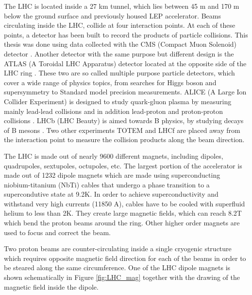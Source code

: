 The LHC is located inside a 27 km tunnel, which lies between 45 m and 170 m below the ground surface and previously housed LEP accelerator. Beams circulating inside the LHC, collide at four interaction points. At each of these points, a detector has been built to record the products of particle collisions. This thesis was done using data collected with the CMS (Compact Muon Solenoid) detector \cite{Chatrchyan:2008aa}. Another detector with the same purpose but different design is the ATLAS (A Toroidal LHC Apparatus) detector located at the opposite side of the LHC ring \cite{Aad:2008zzm}. These two are so called multiple purpose particle detectors, which cover a wide range of physics topics, from searches for Higgs boson and supersymmetry to Standard model precision measurements. ALICE (A Large Ion Collider Experiment) is designed to study quark-gluon plasma by measuring mainly lead-lead collisions and in addition lead-proton and proton-proton collisions \cite{Aamodt:2008zz}. LHCb (LHC Beauty) is aimed towards B physics, by studying decays of B mesons \cite{Alves:2008zz}. Two other experiments TOTEM and LHCf are placed away from the interaction point to measure the collision products along the beam direction.
\par The LHC is made out of nearly 9600 different magnets, including dipoles, quadrupoles, sextupoles, octupoles, etc. The largest portion of the accelerator is made out of 1232 dipole magnets which are made using superconducting niobium-titanium (NbTi) cables that undergo a phase transition to a supercondutive state at 9.2K. 
In order to achieve superconductivity and withstand very high currents (11850 A), cables have to be cooled with superfluid helium to less than 2K. They create large magnetic fields, which can reach 8.2T which bend the proton beams around the ring. Other higher order magnets are used to focus and correct the beam. 
\par Two proton beams are counter-circulating inside a single cryogenic structure which requires opposite magnetic field direction for each of the beams in order to be steared along the same circumference. One of the LHC dipole magnets is shown schematically in Figure \ref{fig:LHC_mag} together with the drawing of the magnetic field inside the dipole. 
    
